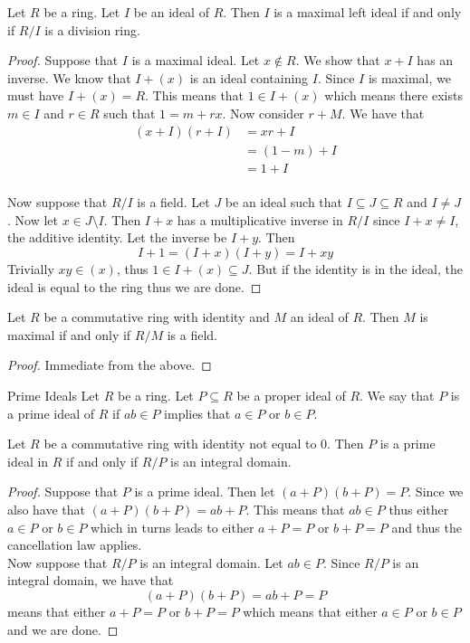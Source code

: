 \documentclass[a4paper]{article}
\begin{document}
\begin{prp}{}{} Let $R$ be a ring. Let $I$ be an ideal of $R$. Then $I$ is a maximal left ideal if and only if $R/I$ is a division ring. 
\begin{proof}
Suppose that $I$ is a maximal ideal. Let $x\notin R$. We show that $x+I$ has an inverse. We know that $I+(x)$ is an ideal containing $I$. Since $I$ is maximal, we must have $I+(x)=R$. This means that $1\in I+(x)$ which means there exists $m\in I$ and $r\in R$ such that $1=m+rx$. Now consider $r+M$. We have that 
\begin{align*}
(x+I)(r+I)&=xr+I\\
&=(1-m)+I\\
&=1+I
\end{align*}~\\
Now suppose that $R/I$ is a field. Let $J$ be an ideal such that $I\subseteq J\subseteq R$ and $I\neq J$. Now let $x\in J\setminus I$. Then $I+x$ has a multiplicative inverse in $R/I$ since $I+x\neq I$, the additive identity. Let the inverse be $I+y$. Then $$I+1=(I+x)(I+y)=I+xy$$ Trivially $xy\in(x)$, thus $1\in I+(x)\subseteq J$. But if the identity is in the ideal, the ideal is equal to the ring thus we are done. 
\end{proof}
\end{prp}

\begin{crl}{}{} Let $R$ be a commutative ring with identity and $M$ an ideal of $R$. Then $M$ is maximal if and only if $R/M$ is a field. 
\begin{proof}
Immediate from the above. 
\end{proof}
\end{crl}

\begin{defn}{Prime Ideals}{} Let $R$ be a ring. Let $P\subseteq R$ be a proper ideal of $R$. We say that $P$ is a prime ideal of $R$ if $ab\in P$ implies that $a\in P$ or $b\in P$. 
\end{defn}

\begin{prp}{}{} Let $R$ be a commutative ring with identity not equal to $0$. Then $P$ is a prime ideal in $R$ if and only if $R/P$ is an integral domain. 
\begin{proof}
Suppose that $P$ is a prime ideal. Then let $(a+P)(b+P)=P$. Since we also have that $(a+P)(b+P)=ab+P$. This means that $ab\in P$ thus either $a\in P$ or $b\in P$ which in turns leads to either $a+P=P$ or $b+P=P$ and thus the cancellation law applies. \\
Now suppose that $R/P$ is an integral domain. Let $ab\in P$. Since $R/P$ is an integral domain, we have that $$(a+P)(b+P)=ab+P=P$$ means that either $a+P=P$ or $b+P=P$ which means that either $a\in P$ or $b\in P$ and we are done. 
\end{proof}
\end{prp}
\end{document}
